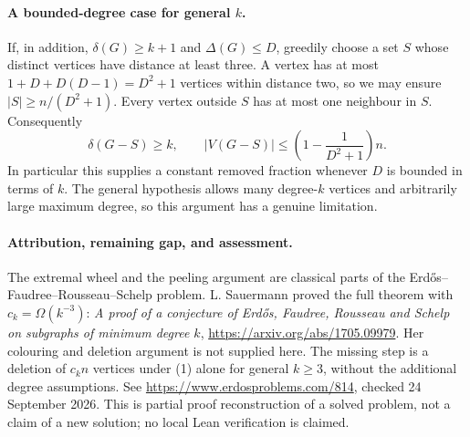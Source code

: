 \paragraph{A bounded-degree case for general \(k\).}
If, in addition, \(\delta(G)\geq k+1\) and \(\Delta(G)\leq D\), greedily choose a set \(S\) whose distinct vertices have distance at least three. A vertex has at most \(1+D+D(D-1)=D^2+1\) vertices within distance two, so we may ensure
\(|S|\geq n/(D^2+1)\). Every vertex outside \(S\) has at most one neighbour in \(S\). Consequently
\[
 \delta(G-S)\geq k,
 \qquad |V(G-S)|\leq\left(1-\frac1{D^2+1}\right)n.
\]
In particular this supplies a constant removed fraction whenever \(D\) is bounded in terms of \(k\). The general hypothesis allows many degree-\(k\) vertices and arbitrarily large maximum degree, so this argument has a genuine limitation.

\paragraph{Attribution, remaining gap, and assessment.}
The extremal wheel and the peeling argument are classical parts of the Erd\H{o}s--Faudree--Rousseau--Schelp problem. L. Sauermann proved the full theorem with \(c_k=\Omega(k^{-3})\): \emph{A proof of a conjecture of Erd\H{o}s, Faudree, Rousseau and Schelp on subgraphs of minimum degree \(k\)}, \url{https://arxiv.org/abs/1705.09979}. Her colouring and deletion argument is not supplied here. The missing step is a deletion of \(c_kn\) vertices under (1) alone for general \(k\geq3\), without the additional degree assumptions. See \url{https://www.erdosproblems.com/814}, checked 24 September 2026. This is partial proof reconstruction of a solved problem, not a claim of a new solution; no local Lean verification is claimed.
